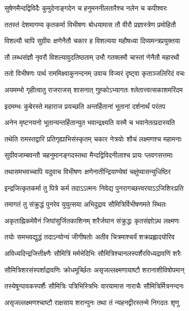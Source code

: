 \twolineshloka
{सुषेणमैन्दद्विविदैः कुमुदेनाङ्गदेन च}
{हनुमननीलतारैश्च नलेन च कपीश्वरः}


\twolineshloka
{ततस्तं देशमागम्य कृतकर्मा विभीषणः}
{बोधयामास तौ वीरौ प्रज्ञास्त्रेण प्रमोहितौ}


\twolineshloka
{विशल्यौ चापि सुग्रीवः क्षणेनैतौ चकार ह}
{विशल्यया महौषध्या दिव्यमन्त्रप्रयुक्तया}


\twolineshloka
{तौ लब्धसंज्ञौ नृवरौ विशल्यावुदतिष्ठताम्}
{उभौ गतक्लमौ चास्तां णेनैतौ महारथौ}


\twolineshloka
{ततो विभीषणः पार्थ राममिक्ष्वाकुनन्दनम्}
{उवाच विज्वरं दृष्ट्वा कृताञ्जलिरिदं वचः}


\twolineshloka
{अयमम्भो गृहीत्वातु राजराजस् शासनात्}
{गुह्कोऽभ्यागतः श्लेतात्त्वत्सकाशमरिंदम}


\twolineshloka
{इदमम्भः कुबेरस्ते महाराज प्रयच्छति}
{अन्तर्हितानां भूतानां दर्शनार्थं परंतप}


\twolineshloka
{अनेन मृष्टनयनो भूतान्यन्तर्हितान्युत}
{भवान्द्रक्ष्यति यस्मै च भवानेतत्प्रदास्यति}


\twolineshloka
{तथेति रामस्तद्वारि प्रतिगृह्याभिसंस्कृतम्}
{चकार नेत्रयोः शौचं लक्ष्मणश्च महामनाः}


\twolineshloka
{सुग्रीवजाम्बवन्तौ चहनुमानङ्गदस्तथा}
{मैन्दद्विविदनीलाश्च प्रायः प्लवगसत्तमाः}


\twolineshloka
{तथासमभवच्चापि यदुवाच विभीषणः}
{क्षणेनातीन्द्रियाण्येषां चक्षुंष्यासन्युधिष्ठिर}


\twolineshloka
{इन्द्रजित्कृतकर्मा तु पित्रे कर्म तदाऽऽत्मनः}
{निवेद्य पुनरागच्छत्त्वरयाऽऽजिशिरःप्रति}


\twolineshloka
{तमागतं तु संक्रुद्धं पुनरेव युयुत्सया}
{अभिदुद्राव सौमित्रिर्विभीषणमते स्थितः}


\twolineshloka
{अकृताह्निकमेवैनं जिघांसुर्जितकाशिनम्}
{शरैर्जघान संक्रुद्धः कृतसंज्ञोऽथ लक्ष्मणः}


\twolineshloka
{तयोः समभवद्युद्धं तदाऽन्योन्यं जीगीषतोः}
{अतीव चित्रमाश्चर्यं शक्रप्रह्लादयोरिव}


\twolineshloka
{अविध्यदिन्द्रजित्तीक्ष्णैः सौमित्रिं मर्मभेदिभिः}
{सौमित्रिश्चानलस्पर्शैरविध्यद्रावणिं शरैः}


\twolineshloka
{सौमित्रिशरसंस्पर्शाद्रावणिः क्रोधमूर्च्छितः}
{असृजल्लक्ष्मणायाष्टौ शरानाशीविषोपमान्}


\twolineshloka
{तस्येषून्पावकस्पर्शैः सौमित्रिः पत्रिभिस्त्रिभिः}
{वारयामास नाराचैः सौमित्रिर्मित्रनन्दनः}


\twolineshloka
{असृजल्लक्ष्मणश्चाष्टौ राक्षसाय शरान्पुनः}
{तथा तं न्यहनद्वीरस्तन्मे निगदतः शृणु}


